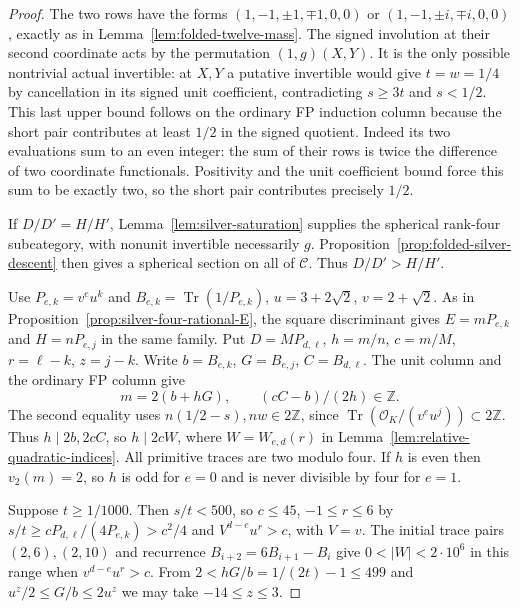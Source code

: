 \documentclass[11pt,reqno]{amsart}
\theoremstyle{remark}\newtheorem{remark}[theorem]{Remark}
\numberwithin{equation}{section}
\begin{document}
\begin{proof}
The two rows have the forms $(1,-1,\pm1,\mp1,0,0)$ or $(1,-1,\pm i,\mp i,0,0)$, exactly as in Lemma~\ref{lem:folded-twelve-mass}. The signed involution at their second coordinate acts by the permutation $(1,g)(X,Y)$. It is the only possible nontrivial actual invertible: at $X,Y$ a putative invertible would give $t=w=1/4$ by cancellation in its signed unit coefficient, contradicting $s\ge3t$ and $s<1/2$. This last upper bound follows on the ordinary FP induction column because the short pair contributes at least $1/2$ in the signed quotient. Indeed its two evaluations sum to an even integer: the sum of their rows is twice the difference of two coordinate functionals. Positivity and the unit coefficient bound force this sum to be exactly two, so the short pair contributes precisely $1/2$.

If $D/D'=H/H'$, Lemma~\ref{lem:silver-saturation} supplies the
spherical rank-four subcategory, with nonunit invertible necessarily
$g$. Proposition~\ref{prop:folded-silver-descent} then gives a
spherical section on all of $\mathcal C$. Thus $D/D'>H/H'$.

Use $P_{e,k}=v^eu^k$ and $B_{e,k}=\operatorname{Tr}(1/P_{e,k})$, $u=3+2\sqrt2$, $v=2+\sqrt2$. As in Proposition~\ref{prop:silver-four-rational-E}, the square discriminant gives $E=mP_{e,k}$ and $H=nP_{e,j}$ in the same family. Put $D=MP_{d,\ell}$, $h=m/n$, $c=m/M$, $r=\ell-k$, $z=j-k$. Write $b=B_{e,k}$, $G=B_{e,j}$, $C=B_{d,\ell}$. The unit column and the ordinary FP column give
\[
 m=2(b+hG),\qquad (cC-b)/(2h)\in\mathbb Z .
\]
The second equality uses $n(1/2-s),nw\in2\mathbb Z$, since $\operatorname{Tr}(\mathcal O_K/(v^e u^j))\subset 2\mathbb Z$. Thus $h\mid2b,2cC$, so $h\mid2cW$, where $W=W_{e,d}(r)$ in Lemma~\ref{lem:relative-quadratic-indices}. All primitive traces are two modulo four. If $h$ is even then $v_2(m)=2$, so $h$ is odd for $e=0$ and is never divisible by four for $e=1$.

Suppose $t\ge1/1000$. Then $s/t<500$, so $c\le45$, $-1\le r\le6$ by $s/t\ge cP_{d,\ell}/(4P_{e,k})>c^2/4$ and $V^{d-e}u^r>c$, with $V=v$. The initial trace pairs $(2,6),(2,10)$ and recurrence $B_{i+2}=6B_{i+1}-B_i$ give $0<|W|<2\cdot10^6$ in this range when $v^{d-e}u^r>c$. From $2<hG/b=1/(2t)-1\le499$ and $u^z/2\le G/b\le2u^z$ we may take $-14\le z\le3$.


\end{proof}
\end{document}
